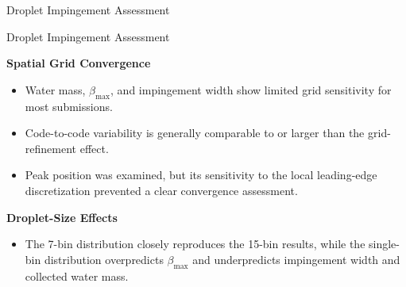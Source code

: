 \begin{frame}{\small Droplet Impingement Assessment}
\scriptsize

\begin{alertblock}{\scriptsize Droplet Impingement Assessment}

\textbf{Spatial Grid Convergence}
\begin{itemize}
    \item Water mass, $\beta_{\max}$, and impingement width show limited grid sensitivity for most submissions.
    
    \item Code-to-code variability is generally comparable to or larger than the grid-refinement effect.
    
    \item Peak position was examined, but its sensitivity to the local leading-edge discretization prevented a clear convergence assessment.
\end{itemize}

\vspace{0.10cm}

\textbf{Droplet-Size Effects}
\begin{itemize}
    \item The 7-bin distribution closely reproduces the 15-bin results, while the single-bin distribution overpredicts $\beta_{\max}$ and underpredicts impingement width and collected water mass.
\end{itemize}

\end{alertblock}

\end{frame}